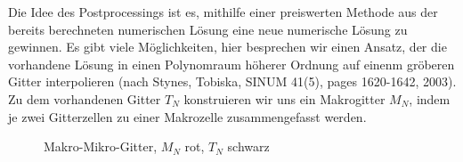 Die Idee des Postprocessings ist es, mithilfe einer preiswerten Methode aus der bereits berechneten numerischen Lösung eine neue numerische Lösung zu gewinnen. Es gibt viele Möglichkeiten, hier besprechen wir einen Ansatz, der die vorhandene Lösung in einen Polynomraum höherer Ordnung auf einenm gröberen Gitter interpolieren (nach Stynes, Tobiska, SINUM 41(5), pages 1620-1642, 2003). Zu dem vorhandenen Gitter $T_{N}$ konstruieren wir uns ein Makrogitter $M_{N}$, indem je zwei Gitterzellen zu einer Makrozelle zusammengefasst werden. 
\begin{figure}[ht!]
  \centering

\caption{Makro-Mikro-Gitter, $M_{N}$ rot, $T_{N}$ schwarz}
\label{fig:macro-micro-grid}
\end{figure}

